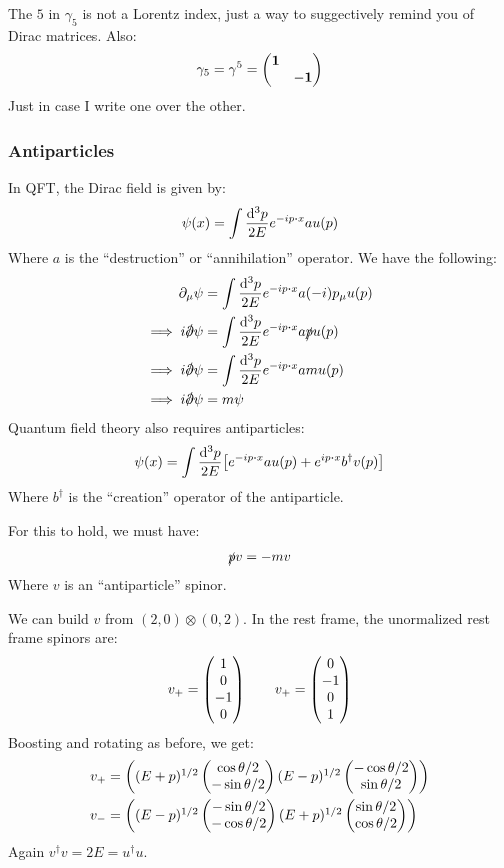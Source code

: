 \begin{aside}
  The $5$ in $\gamma_5$ is not a Lorentz index, just a way to suggectively remind you of Dirac matrices. Also:
  \begin{align*}
    \gamma_5=\gamma^5=\pmqty{\bm{1}\\&-\bm{1}}
  \end{align*}
  Just in case I write one over the other.
\end{aside}

\subsubsection{Antiparticles}
In QFT, the Dirac field is given by:
\begin{align*}
  \psi(x)=\int\frac{\dd[3]{p}}{2E}e^{-ip\vdot x}a u(p)
\end{align*}
Where $a$ is the ``destruction'' or ``annihilation'' operator. We have the following:
\begin{align*}
  \D_\mu\psi&=\int\frac{\dd[3]{p}}{2E}e^{-ip\vdot x}a(-i)p_\mu u(p)\\
  \implies i\sla{\D}\psi&=\int\frac{\dd[3]{p}}{2E}e^{-ip\vdot x}a\sla{p}u(p)\\
  \implies i\sla{\D}\psi&=\int\frac{\dd[3]{p}}{2E}e^{-ip\vdot x}amu(p)\\
  \implies i\sla{\D}\psi&=m\psi
\end{align*}
Quantum field theory also requires antiparticles:
\begin{align*}
  \psi(x)=\int\frac{\dd[3]{p}}{2E}
  \qty[e^{-ip\vdot x}a u(p)+e^{ip\vdot x}b^\dag v(p)]
\end{align*}
Where $b^\dag$ is the ``creation'' operator of the antiparticle.

For this to hold, we must have:
\begin{align*}
  \slashed{p} v= -mv
\end{align*}
Where $v$ is an ``antiparticle'' spinor.

We can build $v$ from $(2,0)\otimes(0,2)$. In the rest frame, the unormalized rest frame spinors are:
\begin{align*}
  v_+=\pmqty{1\\0\\-1\\0}\qquad
  v_+=\pmqty{0\\-1\\0\\1}
\end{align*}
Boosting and rotating as before, we get:
\begin{align*}
  v_{+}&=\pmqty{
    (E+p)^{1/2}\pmqty{\cos\theta/2\\-\sin\theta/2}
    (E-p)^{1/2}\pmqty{-\cos\theta/2\\\sin\theta/2}
  }\\
  v_{-}&=\pmqty{
    (E-p)^{1/2}\pmqty{-\sin\theta/2\\-\cos\theta/2}
    (E+p)^{1/2}\pmqty{\sin\theta/2\\\cos\theta/2}
  }
\end{align*}
Again $v^\dag v=2E=u^\dag u$.

